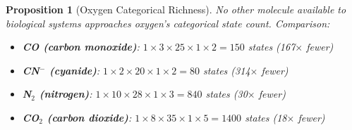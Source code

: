 \documentclass[11pt,a4paper]{article}
\newtheorem{proposition}[theorem]{Proposition}
\begin{document}
\begin{proposition}[Oxygen Categorical Richness]
No other molecule available to biological systems approaches oxygen's categorical state count. Comparison:
\begin{itemize}
\item \textbf{CO (carbon monoxide)}: $1 \times 3 \times 25 \times 1 \times 2 = 150$ states (167$\times$ fewer)
\item \textbf{CN$^-$ (cyanide)}: $1 \times 2 \times 20 \times 1 \times 2 = 80$ states (314$\times$ fewer)
\item \textbf{N$_2$ (nitrogen)}: $1 \times 10 \times 28 \times 1 \times 3 = 840$ states (30$\times$ fewer)
\item \textbf{CO$_2$ (carbon dioxide)}: $1 \times 8 \times 35 \times 1 \times 5 = 1400$ states (18$\times$ fewer)
\end{itemize}
\end{proposition}
\end{document}
